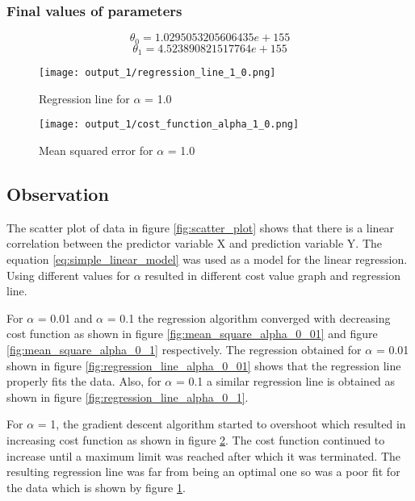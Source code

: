 \subsubsection{Final values of parameters}
\begin{equation}
\theta_0 = 1.0295053205606435e+155
\end{equation}
\begin{equation}
\theta_1 = 4.523890821517764e+155
\end{equation}

\begin{figure}[!ht]
    \texttt{[image: output\_1/regression\_line\_1\_0.png]}
    \caption{Regression line for $\alpha$ = 1.0}
    \label{fig:regression_line_alpha_1_0}
\end{figure}

\begin{figure}[!ht]
    \texttt{[image: output\_1/cost\_function\_alpha\_1\_0.png]}
    \caption{Mean squared error for $\alpha$ = 1.0}
    \label{fig:mean_squared_error_alpha_1_0}
\end{figure}

\subsection{Observation}
The scatter plot of data in figure \ref{fig:scatter_plot} shows that there is a linear correlation between the predictor variable X and prediction variable Y. The equation \ref{eq:simple_linear_model} was used as a model for the linear regression. Using different values for $\alpha$ resulted in different cost value graph and regression line.

For $\alpha$ = 0.01 and $\alpha$ = 0.1 the regression algorithm converged with decreasing cost function as shown in figure \ref{fig:mean_square_alpha_0_01} and figure \ref{fig:mean_square_alpha_0_1} respectively. The regression obtained for $\alpha$ = 0.01 shown in figure \ref{fig:regression_line_alpha_0_01} shows that the regression line properly fits the data. Also, for $\alpha$ = 0.1 a similar regression line is obtained as shown in figure \ref{fig:regression_line_alpha_0_1}.

For $\alpha$ = 1, the gradient descent algorithm started to overshoot which resulted in increasing cost function as shown in figure \ref{fig:mean_squared_error_alpha_1_0}. The cost function continued to increase until a maximum limit was reached after which it was terminated. The resulting regression line was far from being an optimal one so was a poor fit for the data which is shown by figure \ref{fig:regression_line_alpha_1_0}.

